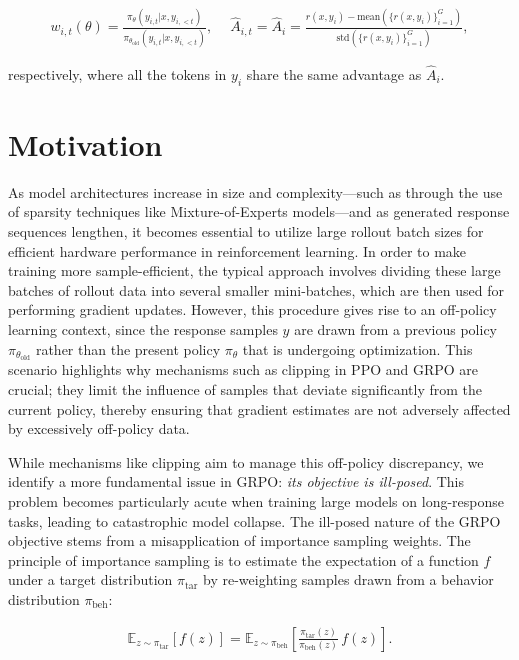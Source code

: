 \begin{align}
    w_{i,t}(\theta)=\frac{ \pi_{\theta} (y_{i,t} | x, y_{i,<t}) }{ \pi_{\theta_\text{old}} (y_{i,t} | x,y_{i,<t})},\quad\ 
    \widehat{A}_{i,t} = \widehat{A}_{i} = \frac{r(x, y_i) - \mathrm{mean} \left( \{ r(x, y_i) \}_{i=1}^G \right) }{ \mathrm{std} \left( \{ r(x, y_i) \}_{i=1}^G \right) },
\end{align}

respectively, where all the tokens in $y_i$ share the same advantage as $\widehat{A}_{i}$.

\section{Motivation}
\label{sec:motivation}

As model architectures increase in size and complexity—such as through the use of sparsity techniques like Mixture-of-Experts models—and as generated response sequences lengthen, it becomes essential to utilize large rollout batch sizes for efficient hardware performance in reinforcement learning. In order to make training more sample-efficient, the typical approach involves dividing these large batches of rollout data into several smaller mini-batches, which are then used for performing gradient updates. However, this procedure gives rise to an off-policy learning context, since the response samples $y$ are drawn from a previous policy $\pi_{\theta_\text{old}}$ rather than the present policy $\pi_\theta$ that is undergoing optimization. This scenario highlights why mechanisms such as clipping in PPO and GRPO are crucial; they limit the influence of samples that deviate significantly from the current policy, thereby ensuring that gradient estimates are not adversely affected by excessively off-policy data.

While mechanisms like clipping aim to manage this off-policy discrepancy, we identify a more fundamental issue in GRPO: \textit{its objective is ill-posed}. This problem becomes particularly acute when training large models on long-response tasks, leading to catastrophic model collapse. The ill-posed nature of the GRPO objective stems from a misapplication of importance sampling weights. The principle of importance sampling is to estimate the expectation of a function $f$ under a target distribution $\pi_\text{tar}$ by re-weighting samples drawn from a behavior distribution $\pi_\text{beh}$:

\begin{align}
\mathbb{E}_{z \sim \pi_\text{tar}} \left[ f(z) \right] = \mathbb{E}_{z \sim \pi_\text{beh}} \left[ \frac{ \pi_\text{tar} (z) }{ \pi_\text{beh} (z)} \, f(z) \right].
\end{align}

